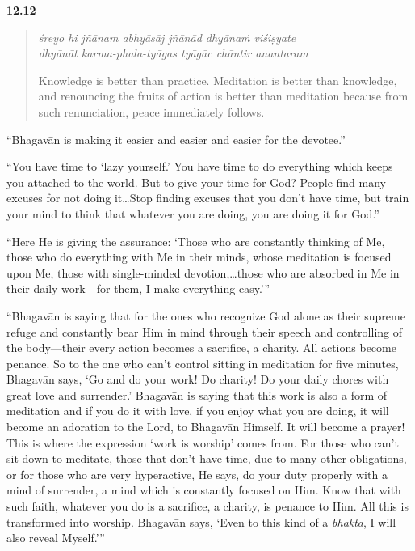 \par\noindent\textbf{12.12}\par
\begin{verse}
\textit{śreyo hi jñānam abhyāsāj jñānād dhyānaṁ viśiṣyate} \\
\textit{dhyānāt karma-phala-tyāgas tyāgāc chāntir anantaram}

\noindent Knowledge is better than practice. Meditation is better than knowledge, and renouncing the fruits of action is better than meditation because from such renunciation, peace immediately follows.
\end{verse}
\par


\enquote{Bhagavān is making it easier and easier and easier for the devotee.}

\enquote{You have time to \enquote{lazy yourself.} You have time to do everything which keeps you attached to the world. But to give your time for God? People find many excuses for not doing it\ldots Stop finding excuses that you don’t have time, but train your mind to think that whatever you are doing, you are doing it for God.}

\enquote{Here He is giving the assurance: \enquote{Those who are constantly thinking of Me, those who do everything with Me in their minds, whose meditation is focused upon Me, those with single-minded devotion,\ldots those who are absorbed in Me in their daily work---for them, I make everything easy.}}

\enquote{Bhagavān is saying that for the ones who recognize God alone as their supreme refuge and constantly bear Him in mind through their speech and controlling of the body---their every action becomes a sacrifice, a charity. All actions become penance. So to the one who can’t control sitting in meditation for five minutes, Bhagavān says, \enquote{Go and do your work! Do charity! Do your daily chores with great love and surrender.} Bhagavān is saying that this work is also a form of meditation and if you do it with love, if you enjoy what you are doing, it will become an adoration to the Lord, to Bhagavān Himself. It will become a prayer! This is where the expression \enquote{work is worship} comes from. For those who can’t sit down to meditate, those that don’t have time, due to many other obligations, or for those who are very hyperactive, He says, do your duty properly with a mind of surrender, a mind which is constantly focused on Him. Know that with such faith, whatever you do is a sacrifice, a charity, is penance to Him. All this is transformed into worship. Bhagavān says, \enquote{Even to this kind of a \textit{bhakta}, I will also reveal Myself.}}

